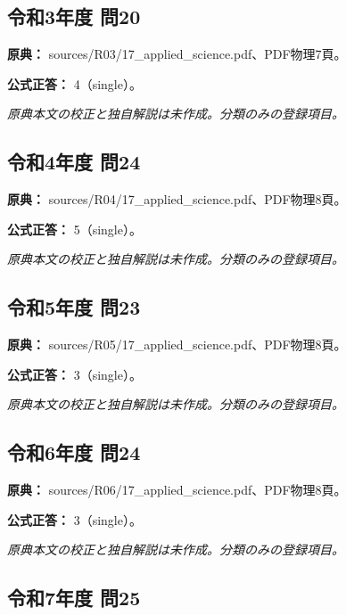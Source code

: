 \subsection{令和3年度 問20}
\label{q:r03-reg-applied-20}

\noindent\textbf{原典：} sources/R03/17\_applied\_science.pdf、PDF物理7頁。

\textbf{公式正答：} 4（single）。

\par\textit{原典本文の校正と独自解説は未作成。分類のみの登録項目。}

\subsection{令和4年度 問24}
\label{q:r04-reg-applied-24}

\noindent\textbf{原典：} sources/R04/17\_applied\_science.pdf、PDF物理8頁。

\textbf{公式正答：} 5（single）。

\par\textit{原典本文の校正と独自解説は未作成。分類のみの登録項目。}

\subsection{令和5年度 問23}
\label{q:r05-reg-applied-23}

\noindent\textbf{原典：} sources/R05/17\_applied\_science.pdf、PDF物理8頁。

\textbf{公式正答：} 3（single）。

\par\textit{原典本文の校正と独自解説は未作成。分類のみの登録項目。}

\subsection{令和6年度 問24}
\label{q:r06-reg-applied-24}

\noindent\textbf{原典：} sources/R06/17\_applied\_science.pdf、PDF物理8頁。

\textbf{公式正答：} 3（single）。

\par\textit{原典本文の校正と独自解説は未作成。分類のみの登録項目。}

\subsection{令和7年度 問25}
\label{q:r07-reg-applied-25}

